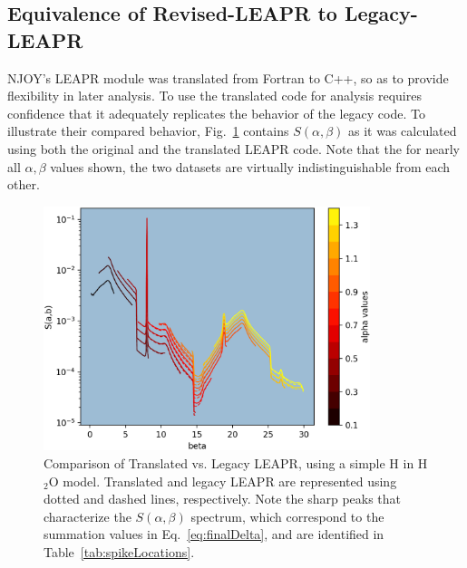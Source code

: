 \documentclass[Master.tex]{subfiles}
\begin{document}
  \subsection{Equivalence of Revised-LEAPR to Legacy-LEAPR}
    NJOY's LEAPR module was translated from Fortran to C++, so as to provide flexibility in later analysis. To use the translated code for analysis requires confidence that it adequately replicates the behavior of the legacy code. To illustrate their compared behavior, Fig.~\ref{fig:me_vs_njoy_sab} contains $S(\alpha,\beta)$ as it was calculated using both the original and the translated LEAPR code. Note that the for nearly all $\alpha,\beta$ values shown, the two datasets are virtually indistinguishable from each other. 
    \begin{figure}[h]
      \begin{center}
        \includegraphics[width=0.85\textwidth]{images/me-vs-njoy-1c}
        \caption[Comparison of Translated vs. Legacy LEAPR, for Test \#9 ($S(\alpha,\beta)$)]{Comparison of Translated vs. Legacy LEAPR, using a simple H in H$_2$O model. Translated and legacy LEAPR are represented using dotted and dashed lines, respectively. Note the sharp peaks that characterize the $S(\alpha,\beta)$ spectrum, which correspond to the summation values in Eq.~\ref{eq:finalDelta}, and are identified in Table~\ref{tab:spikeLocations}.}
        \label{fig:me_vs_njoy_sab}
      \end{center}
    \end{figure}
\end{document}

